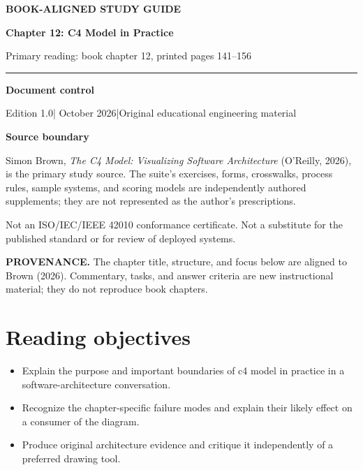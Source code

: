 \documentclass[10pt,letterpaper]{article}
\newcommand{\SourceNote}[1]{\par\smallskip\noindent\colorbox{C4Light}{\parbox{0.94\linewidth}{\footnotesize\textbf{PROVENANCE.} #1}}\par\medskip}
\newcommand{\DocStart}[3]{%
\begin{document}
\begin{titlepage}
\renewcommand{\thepage}{title-\arabic{page}}
\vspace*{0.55in}
{\sffamily\bfseries\small\color{C4Teal}#1}\par\vspace{0.24in}
{\sffamily\bfseries\fontsize{26}{31}\selectfont\color{C4Navy}#2}\par\vspace{0.18in}
{\large\color{C4Gray}#3}\par\vspace{0.4in}
\textcolor{C4Teal}{\rule{\linewidth}{1.15pt}}\par\vspace{0.24in}
\textbf{Document control}\par
Edition 1.0\quad|\quad 30 October 2026\quad|\quad Original educational engineering material\par
\vspace{0.17in}
\textbf{Source boundary}\par
Simon Brown, \emph{The C4 Model: Visualizing Software Architecture} (O'Reilly, 2026), is the primary study source. The suite's exercises, forms, crosswalks, process rules, sample systems, and scoring models are independently authored supplements; they are not represented as the author's prescriptions.\par
\vfill
{\small\color{C4Gray}Not an ISO/IEC/IEEE 42010 conformance certificate. Not a substitute for the published standard or for review of deployed systems.}\par
\end{titlepage}
}
\DocStart{BOOK-ALIGNED STUDY GUIDE}{Chapter 12: C4 Model in Practice}{Primary reading: book chapter 12, printed pages 141–156}
\SourceNote{The chapter title, structure, and focus below are aligned to Brown (2026). Commentary, tasks, and answer criteria are new instructional material; they do not reproduce book chapters.}
\section{Reading objectives}
\begin{itemize}
\item Explain the purpose and important boundaries of c4 model in practice in a software-architecture conversation.
\item Recognize the chapter-specific failure modes and explain their likely effect on a consumer of the diagram.
\item Produce original architecture evidence and critique it independently of a preferred drawing tool.
\end{itemize}
\end{document}
